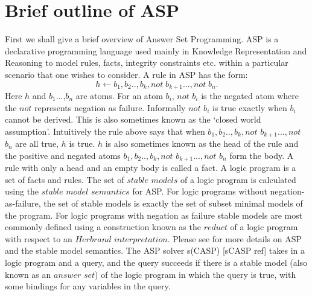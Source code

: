 \section{Brief outline of ASP}
First we shall give a brief overview of Answer Set Programming. ASP is a declarative programming language used mainly in Knowledge Representation and Reasoning to model rules, facts, integrity constraints etc. within a particular scenario that one wishes to consider. A rule in ASP has the form:
\[h\leftarrow b_{1},b_{2}..,b_{k},not\; b_{k+1}...,not\; b_{n}.\] Here $h$ and
$b_{1}$...,$b_{n}$ are atoms. For an atom $b_{i}$, $not$ $b_{i}$ is the
negated atom where the $not$ represents negation as failure. Informally $not$
$b_{i}$ is true exactly when $b_{i}$ cannot be derived. This is also sometimes
known as the `closed world assumption'. Intuitively the rule above says that
when $b_{1},b_{2}..,b_{k},not$ $b_{k+1}...,not$ $b_{n}$ are all true, $h$ is
true. $h$ is also sometimes known as the head of the rule and the positive and
negated atoms $b_{1},b_{2}..,b_{k},not$ $b_{k+1}...,not$ $b_{n}$ form the
body. A rule with only a head and an empty body is called a fact. A logic
program is a set of facts and rules. The set
of $stable$ $models$ of a logic program is calculated using the $stable$
$model$ $semantics$ for ASP. For logic programs without negation-as-failure,
the set of stable models is exactly the set of subset minimal models of the
program. For logic programs with negation as failure stable models are most
commonly defined using a construction known as the $reduct$ of a logic program
with respect to an $Herbrand$ $interpretation$. Please see
\citep{asp_background} for more details on ASP and the stable model semantics. The ASP solver s(CASP) [sCASP ref] takes in a logic program and a query, and the query succeeds if there is a stable model (also known as an $answer$ $set$) of the logic program in which the query is true, with some bindings for any variables in the query.

